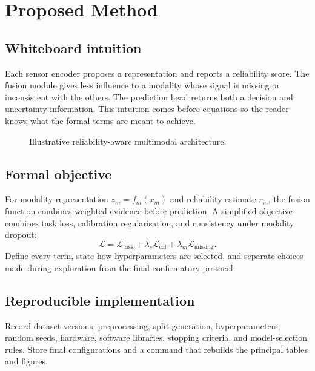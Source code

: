 \chapter{Proposed Method}\label{ch:m-methodology}
\section{Whiteboard intuition}
Each sensor encoder proposes a representation and reports a reliability score. The fusion module gives less influence to a modality whose signal is missing or inconsistent with the others. The prediction head returns both a decision and uncertainty information. This intuition comes before equations so the reader knows what the formal terms are meant to achieve.

\begin{figure}[htbp]
\centering
{}\pipelinearrow
{}\pipelinearrow
{}\pipelinearrow
{}
\caption{Illustrative reliability-aware multimodal architecture.}
\label{fig:m-architecture}
\end{figure}

\section{Formal objective}
For modality representation $z_m=f_m(x_m)$ and reliability estimate $r_m$, the fusion function combines weighted evidence before prediction. A simplified objective combines task loss, calibration regularisation, and consistency under modality dropout:
\begin{equation}
\mathcal{L}=\mathcal{L}_{\mathrm{task}}+\lambda_{c}\mathcal{L}_{\mathrm{cal}}+\lambda_{m}\mathcal{L}_{\mathrm{missing}}.
\end{equation}
Define every term, state how hyperparameters are selected, and separate choices made during exploration from the final confirmatory protocol.

\section{Reproducible implementation}
Record dataset versions, preprocessing, split generation, hyperparameters, random seeds, hardware, software libraries, stopping criteria, and model-selection rules. Store final configurations and a command that rebuilds the principal tables and figures.

